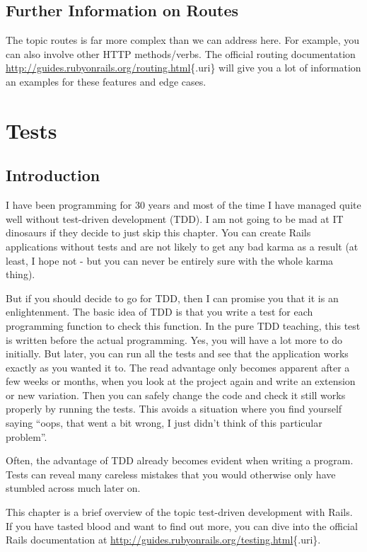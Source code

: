 \documentclass[a4paper]{book}
\newcommand{\chap}[1]{\newpage\thispagestyle{empty}\chapter{#1}\label{chap:\thechapter}}
\begin{document}
\section{Further Information on Routes}\label{further-information-on-routes}

The topic routes is far more complex than we can address here. For example, you can also involve other HTTP methods/verbs. The official routing documentation \url{http://guides.rubyonrails.org/routing.html}\{.uri\} will give you a lot of information an examples for these features and edge cases.

\chap{Tests}\label{tests}

\section{Introduction}\label{introduction-3}

I have been programming for 30 years and most of the time I have managed quite well without test-driven development (TDD). I am not going to be mad at IT dinosaurs if they decide to just skip this chapter. You can create Rails applications without tests and are not likely to get any bad karma as a result (at least, I hope not - but you can never be entirely sure with the whole karma thing).

But if you should decide to go for TDD, then I can promise you that it is an enlightenment. The basic idea of TDD is that you write a test for each programming function to check this function. In the pure TDD teaching, this test is written before the actual programming. Yes, you will have a lot more to do initially. But later, you can run all the tests and see that the application works exactly as you wanted it to. The read advantage only becomes apparent after a few weeks or months, when you look at the project again and write an extension or new variation. Then you can safely change the code and check it still works properly by running the tests. This avoids a situation where you find yourself saying “oops, that went a bit wrong, I just didn't think of this particular problem”.

Often, the advantage of TDD already becomes evident when writing a program. Tests can reveal many careless mistakes that you would otherwise only have stumbled across much later on.

This chapter is a brief overview of the topic test-driven development with Rails. If you have tasted blood and want to find out more, you can dive into the official Rails documentation at \url{http://guides.rubyonrails.org/testing.html}\{.uri\}.
\end{document}
